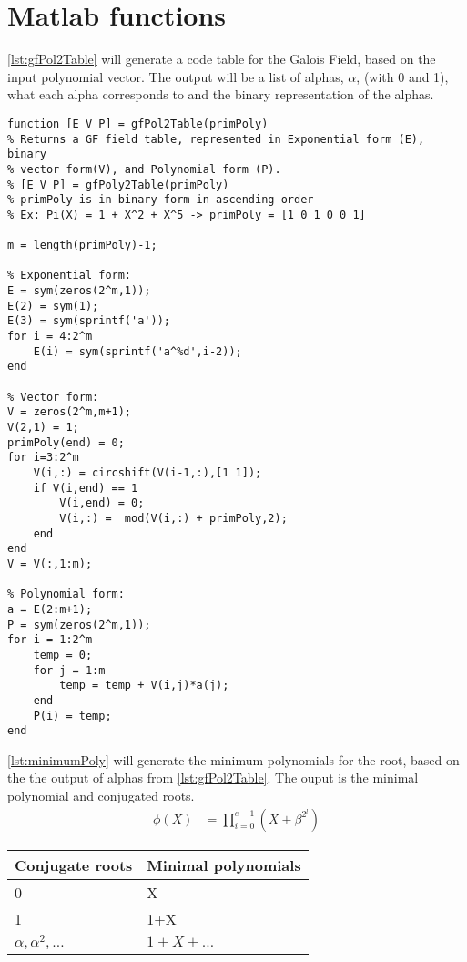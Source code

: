 \documentclass[Main]{subfiles}
\begin{document}
\section*{Matlab functions}

\codeTitle \ref{lst:gfPol2Table} will generate a code table for the Galois Field, based on the input polynomial vector.
The output will be a list of alphas, $\alpha$, (with 0 and 1), what each alpha corresponds to and the binary representation of the alphas.

\begin{lstlisting}[caption=gfPol2Table, style=Code-Matlab, label=lst:gfPol2Table]
function [E V P] = gfPol2Table(primPoly)
% Returns a GF field table, represented in Exponential form (E), binary
% vector form(V), and Polynomial form (P).
% [E V P] = gfPoly2Table(primPoly)
% primPoly is in binary form in ascending order
% Ex: Pi(X) = 1 + X^2 + X^5 -> primPoly = [1 0 1 0 0 1]

m = length(primPoly)-1;

% Exponential form:
E = sym(zeros(2^m,1));
E(2) = sym(1);
E(3) = sym(sprintf('a'));
for i = 4:2^m
    E(i) = sym(sprintf('a^%d',i-2));
end

% Vector form:
V = zeros(2^m,m+1);
V(2,1) = 1;
primPoly(end) = 0;
for i=3:2^m
    V(i,:) = circshift(V(i-1,:),[1 1]);
    if V(i,end) == 1
        V(i,end) = 0;
        V(i,:) =  mod(V(i,:) + primPoly,2);
    end
end
V = V(:,1:m);

% Polynomial form:
a = E(2:m+1);
P = sym(zeros(2^m,1));
for i = 1:2^m
    temp = 0;
    for j = 1:m
        temp = temp + V(i,j)*a(j);
    end
    P(i) = temp;
end
\end{lstlisting}



\codeTitle \ref{lst:minimumPoly} will generate the minimum polynomials for the root, based on the the output of alphas from \codeTitle \ref{lst:gfPol2Table}.
The ouput is the minimal polynomial and conjugated roots.
\begin{align*}
\phi (X) &= \prod_{i=0}^{e-1}(X + \beta^{2^l})
\end{align*}

\begin{table}[H]
\centering
\begin{tabular}{l l}
\hline
Conjugate roots & Minimal polynomials \\\hline
0 & X \\
1 & 1+X \\
$\alpha, \alpha^{2}, \ldots$ & $1+X+\ldots$ \\
\hline
\end{tabular}
\end{table}
\end{document}
